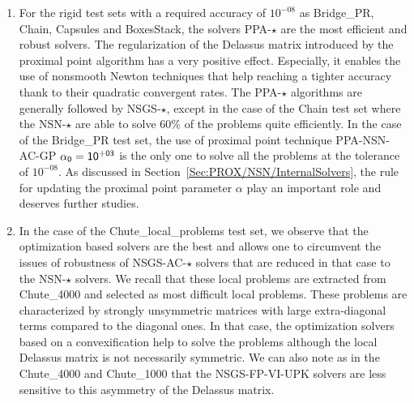 \begin{enumerate}
\item For the rigid test sets with a required accuracy of $10^{-08}$ as Bridge\_PR, Chain, Capsules and BoxesStack, the solvers {\sf PPA-$\star$} are the most efficient and robust solvers. The regularization of the Delassus matrix  introduced by the proximal point algorithm has a very positive effect. Especially, it enables the use of nonsmooth Newton techniques that help reaching a tighter accuracy thank to their quadratic convergent rates. The {\sf PPA-$\star$} algorithms are generally followed by {\sf NSGS-$\star$}, except in the case of the Chain test set where the  {\sf NSN-$\star$} are able to solve 60\% of the problems quite efficiently. In the case of the Bridge\_PR test set, the use of proximal point technique {\sf PPA-NSN-AC-GP $\sf \alpha_0 = 10^{+03}$} is the only one  to solve all the problems at the tolerance of  $10^{-08}$. As discussed in Section~\ref{Sec:PROX/NSN/InternalSolvers}, the rule for updating the proximal point parameter $\alpha$ play an important role and deserves further studies.
  
\item In the case of the Chute\_local\_problems test set, we observe that the optimization based solvers are the best and allows one to circumvent the issues of robustness of {\sf NSGS-AC-$\star$} solvers that are reduced in that case to the {\sf NSN-$\star$} solvers. We recall that these local problems are extracted from Chute\_4000 and selected as most difficult local problems. These problems are characterized by strongly unsymmetric matrices with large extra-diagonal terms compared to the diagonal ones. In that case, the optimization solvers based on a convexification help to solve the problems although the local Delassus matrix is not necessarily symmetric. We can also note as in the Chute\_4000 and Chute\_1000 that  the {\sf NSGS-FP-VI-UPK} solvers are less sensitive to this asymmetry of the Delassus matrix.
 \end{enumerate}


